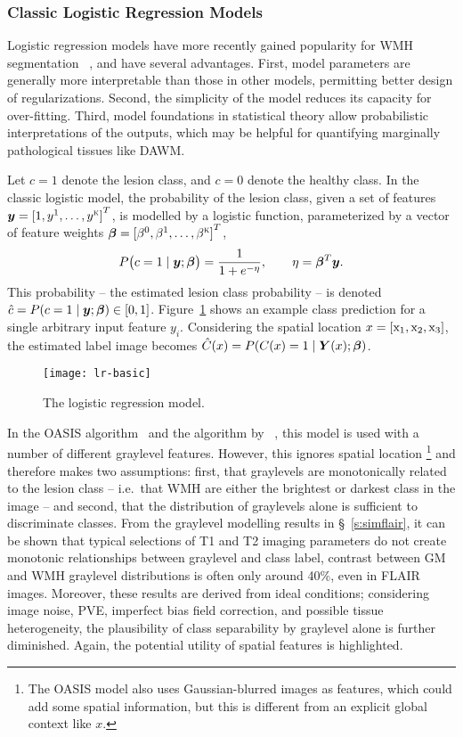 \subsubsection{Classic Logistic Regression Models}\label{sss:limits-lr}
Logistic regression models have more recently gained popularity for WMH segmentation%
~\cite{Sweeney2013,Zhan2017,Sweeney2013a,Schmidt2017a}, and have several advantages.
First, model parameters are generally more interpretable than those in other models,
permitting better design of regularizations.
Second, the simplicity of the model reduces its capacity for over-fitting.
Third, model foundations in statistical theory allow probabilistic interpretations of the outputs,
which may be helpful for quantifying marginally pathological tissues like DAWM.
\par
Let $c=1$ denote the lesion class, and $c=0$ denote the healthy class.
In the classic logistic model,
the probability of the lesion class,
given a set of features $\bm{y} = {[1,y^1,\dots,y^{\textsc{k}}]}^T$,
is modelled by a logistic function,
parameterized by a vector of feature weights $\bm{\beta} = {[\beta^0,\beta^1,\dots,\beta^{\textsc{k}}]}^T$,
\begin{equation}
  P\big(c=1\mid\by;\bb\big) = \frac{1}{1+e^{-\eta}},\qquad\eta = \bb^T\by.%
  \label{eq:lrmodel-basic}
\end{equation}
This probability -- the estimated lesion class probability --
is denoted $\hat{c} = P(c=1\mid\bm{y};\bm{\beta}) \in [0,1]$.
Figure~\ref{fig:lr-basic} shows an example class prediction
for a single arbitrary input feature $y_i$.
Considering the spatial location $x = [\mathrm{x}_1,\mathrm{x}_2,\mathrm{x}_3]$,
the estimated label image becomes $\hat{C}(x) = P(C(x)=1\mid\bm{Y}(x);\bm{\beta})$.
\par
\begin{figure}
  \centering\texttt{[image: lr-basic]}
  \caption{The logistic regression model.}%
  \label{fig:lr-basic}
\end{figure}
In the OASIS algorithm~\cite{Sweeney2013,Sweeney2013a}
and the algorithm by \citeauthor{Zhan2017}~\cite{Zhan2017},
this model is used with a number of different graylevel features.
However, this ignores spatial location%
\footnote{The OASIS model also uses Gaussian-blurred images as features,
  which could add some spatial information,
  but this is different from an explicit global context like $x$.}
and therefore makes two assumptions:
first, that graylevels are monotonically related to the lesion class
-- i.e.\ that WMH are either the brightest or darkest class in the image --
and second, that the distribution of graylevels alone is sufficient to discriminate classes.
From the graylevel modelling results in \S~\ref{s:simflair},
it can be shown that typical selections of T1 and T2 imaging parameters
do not create monotonic relationships between graylevel and class label,
contrast between GM and WMH graylevel distributions
is often only around 40\%, even in FLAIR images.
Moreover, these results are derived from ideal conditions;
considering image noise, PVE, imperfect bias field correction, and possible tissue heterogeneity,
the plausibility of class separability by graylevel alone is further diminished.
Again, the potential utility of spatial features is highlighted.
